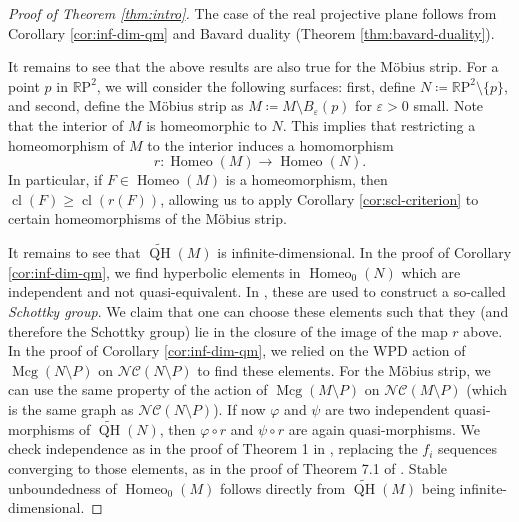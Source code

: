 \documentclass[a4paper]{article}
\let\phi\varphi %
\let\epsilon\varepsilon %
\newcommand{\rp}{\mathbb{R}\mathrm{P}^2}
\newcommand{\ncg}{\mathcal{NC}}
\begin{document}
\begin{proof}[Proof of Theorem \ref{thm:intro}]
The case of the real projective plane follows from Corollary \ref{cor:inf-dim-qm} and Bavard duality (Theorem \ref{thm:bavard-duality}).

It remains to see that the above results are also true for the Möbius strip.
For a point $p$ in $\rp$, we will consider the following surfaces:
first, define $ N \coloneqq \rp\setminus \{p\}$, and second, define the Möbius strip as $M\coloneqq M\setminus B_\epsilon(p)$ for $\epsilon>0$ small.
Note that the interior of $M$ is homeomorphic to $N$.
This implies that restricting a homeomorphism of $M$ to the interior induces a homomorphism
\[r\colon \operatorname{Homeo}(M) \longrightarrow \operatorname{Homeo}(N).\]
In particular, if $F\in\operatorname{Homeo}(M)$ is a homeomorphism, then $\operatorname{cl}(F)\geq \operatorname{cl}(r(F))$, allowing us to apply Corollary \ref{cor:scl-criterion} to certain homeomorphisms of the Möbius strip.

It remains to see that $\widetilde{\operatorname{QH}}(M)$ is infinite-dimensional.
In the proof of Corollary \ref{cor:inf-dim-qm}, we find hyperbolic elements in $\operatorname{Homeo}_0(N)$ which are independent and not quasi-equivalent.
In \cite{Bestvina}, these are used to construct a so-called \emph{Schottky group}.
We claim that one can choose these elements such that they (and therefore the Schottky group) lie in the closure of the image of the map $r$ above.
In the proof of Corollary \ref{cor:inf-dim-qm}, we relied on the WPD action of $\operatorname{Mcg}(N\setminus P)$ on $\ncg(N\setminus P)$ to find these elements.
For the Möbius strip, we can use the same property of the action of $\operatorname{Mcg}(M\setminus P)$ on $\ncg(M\setminus P)$ (which is the same graph as $\ncg(N\setminus P)$).
If now $\phi$ and $\psi$ are two independent quasi-morphisms of $\widetilde{\operatorname{QH}}(N)$, then $\phi\circ r$ and $\psi \circ r$ are again quasi-morphisms.
We check independence as in the proof of Theorem 1 in \cite{Bestvina}, replacing the $f_i$ sequences converging to those elements, as in the proof of Theorem 7.1 of \cite{BHW2}.
Stable unboundedness of $\operatorname{Homeo}_0(M)$ follows directly from $\widetilde{\operatorname{QH}}(M)$ being infinite-dimensional.
\end{proof}



\end{document}
